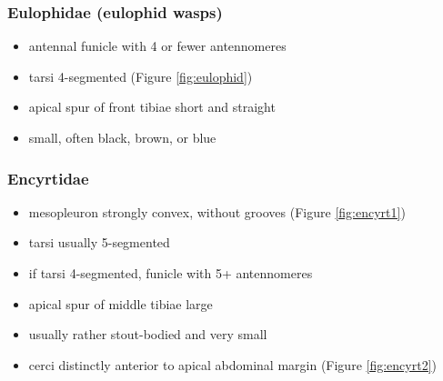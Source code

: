 \documentclass[letterpaper, 11pt]{article}
\begin{document}
\subsubsection{Eulophidae (eulophid wasps)}
\begin{itemize}
\item antennal funicle with 4 or fewer antennomeres
\item tarsi 4-segmented (Figure \ref{fig:eulophid})
\item apical spur of front tibiae short and straight
\item small, often black, brown, or blue
\end{itemize}

\subsubsection{Encyrtidae}
\begin{itemize}
\item mesopleuron strongly convex, without grooves (Figure \ref{fig:encyrt1})
\item tarsi usually 5-segmented
\item if tarsi 4-segmented, funicle with 5+ antennomeres
\item apical spur of middle tibiae large
\item usually rather stout-bodied and very small
\item cerci distinctly anterior to apical abdominal margin (Figure \ref{fig:encyrt2})
\end{itemize}
\end{document}

